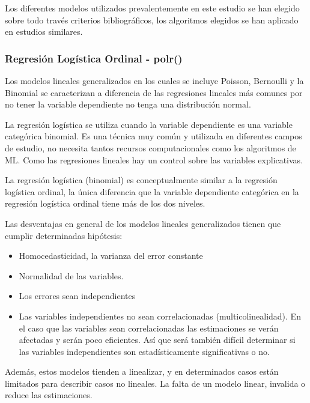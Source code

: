 \documentclass[
]{article}
\begin{document}
Los diferentes modelos utilizados prevalentemente en este estudio se han
elegido sobre todo través criterios bibliográficos, los algoritmos
elegidos se han aplicado en estudios similares.

\hypertarget{regresiuxf3n-loguxedstica-ordinal---polr}{%
\subsubsection{Regresión Logística Ordinal -
polr()}\label{regresiuxf3n-loguxedstica-ordinal---polr}}

Los modelos lineales generalizados en los cuales se incluye Poisson,
Bernoulli y la Binomial se caracterizan a diferencia de las regresiones
lineales más comunes por no tener la variable dependiente no tenga una
distribución normal.

La regresión logística se utiliza cuando la variable dependiente es una
variable categórica binomial. Es una técnica muy común y utilizada en
diferentes campos de estudio, no necesita tantos recursos
computacionales como los algoritmos de ML. Como las regresiones lineales
hay un control sobre las variables explicativas.

La regresión logística (binomial) es conceptualmente similar a la
regresión logística ordinal, la única diferencia que la variable
dependiente categórica en la regresión logística ordinal tiene más de
los dos niveles.

Las desventajas en general de los modelos lineales generalizados tienen
que cumplir determinadas hipótesis:

\begin{itemize}
\item
  Homocedasticidad, la varianza del error constante
\item
  Normalidad de las variables.
\item
  Los errores sean independientes
\item
  Las variables independientes no sean correlacionadas
  (multicolinealidad). En el caso que las variables sean correlacionadas
  las estimaciones se verán afectadas y serán poco eficientes. Así que
  será también difícil determinar si las variables independientes son
  estadísticamente significativas o no.
\end{itemize}

Además, estos modelos tienden a linealizar, y en determinados casos
están limitados para describir casos no lineales. La falta de un modelo
linear, invalida o reduce las estimaciones.
\end{document}
